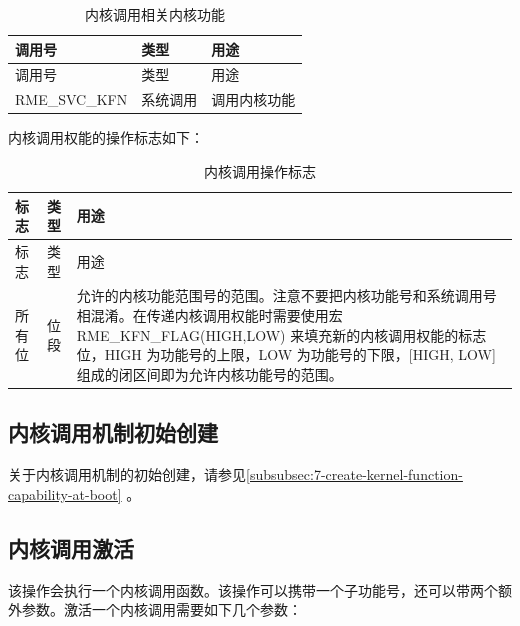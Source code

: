 \begin{xltabular}{\textwidth}{@{}>{\hsize\raggedright\arraybackslash}X>{\hsize\raggedright\arraybackslash}X>{\hsize\raggedright\arraybackslash}X@{}}
\caption{内核调用相关内核功能}\label{tab:6-1-kernel-call-related-kernel-functions}\\
\toprule
调用号 & 类型 & 用途\tabularnewline
\endfirsthead
\toprule
调用号 & 类型 & 用途\tabularnewline
\midrule
\endhead
\bottomrule
\endlastfoot
RME\_SVC\_KFN & 系统调用 & 调用内核功能\tabularnewline
\end{xltabular}

内核调用权能的操作标志如下：

\begin{xltabular}{\textwidth}{@{}>{\hsize\raggedright\arraybackslash}X>{\hsize\raggedright\arraybackslash}X>{\hsize\raggedright\arraybackslash}X@{}}
\caption{内核调用操作标志}\label{tab:6-2-kernel-call-operation-flags}\\
\toprule
标志 & 类型 & 用途\tabularnewline
\endfirsthead
\toprule
标志 & 类型 & 用途\tabularnewline
\midrule
\endhead
\bottomrule
\endlastfoot
所有位 & 位段 &
允许的内核功能范围号的范围。注意不要把内核功能号和系统调用号相混淆。在传递内核调用权能时需要使用宏 RME\_KFN\_FLAG(HIGH,LOW) 来填充新的内核调用权能的标志位，HIGH 为功能号的上限，LOW 为功能号的下限，[HIGH, LOW] 组成的闭区间即为允许内核功能号的范围。\tabularnewline
\end{xltabular}

\subsection{内核调用机制初始创建}\label{subsec:6-kernel-call-initial-creation}

关于内核调用机制的初始创建，请参见\ref{subsubsec:7-create-kernel-function-capability-at-boot}
。

\subsection{内核调用激活}\label{subsec:6-activate-kernel-call}

该操作会执行一个内核调用函数。该操作可以携带一个子功能号，还可以带两个额外参数。激活一个内核调用需要如下几个参数：


